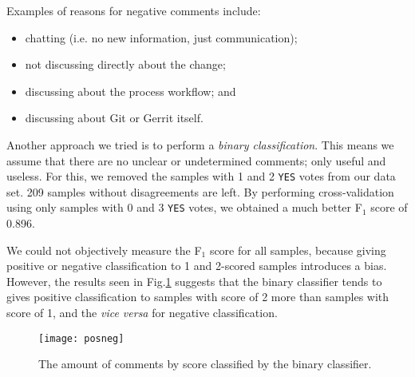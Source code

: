Examples of reasons for negative comments include:

\begin{itemize}
	\item chatting (i.e. no new information, just communication);
	\item not discussing directly about the change;
	\item discussing about the process workflow; and
	\item discussing about Git or Gerrit itself.
\end{itemize}




Another approach we tried is to perform a \emph{binary classification}.
This means we assume that there are no unclear or undetermined comments; only useful and useless.
For this, we removed the samples with 1 and 2 \texttt{YES} votes from our data set. 209 samples without disagreements are left.
By performing cross-validation using only samples with 0 and 3 \texttt{YES} votes, we obtained a much better F$_1$ score of 0.896.

We could not objectively measure the F$_1$ score for all samples, because giving positive or negative classification to 1 and 2-scored samples introduces a bias.
However, the results seen in Fig.\ref{fig:binary} suggests that the binary classifier tends to gives positive classification to samples with score of 2 more than samples with score of 1, and the \emph{vice versa} for negative classification.

\begin{figure}[h]
\centering
\texttt{[image: posneg]}
\caption{The amount of comments by score classified by the binary classifier.}
\label{fig:binary}
\end{figure}
